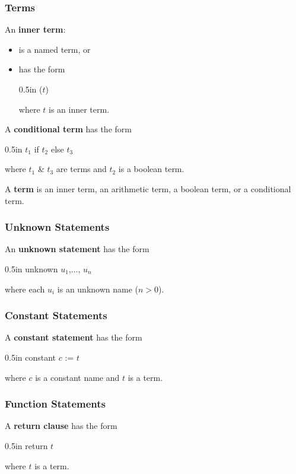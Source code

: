 \documentclass[letterpaper, 12pt]{extarticle}
\theoremstyle{definition} %
\newcommand{\textdef}[1]{\textbf{#1}}
\newenvironment{codeblock}
    {\begin{addmargin}{0.5in} \ttfamily}
    {\end{addmargin}}
\begin{document}
\newpage

\subsubsection{Terms}

An \textdef{inner term}:
\begin{itemize}
\item
is a named term, or
\item
has the form
\begin{codeblock}
($t$)
\end{codeblock}
where $t$ is an inner term.
\end{itemize}

A \textdef{conditional term} has the form
\begin{codeblock}
$t_1$ if $t_2$ else $t_3$
\end{codeblock}
where $t_1$ \& $t_3$ are terms and $t_2$ is a boolean term.

A \textdef{term} is an inner term, an arithmetic term,
a boolean term, or a conditional term.

\subsubsection{Unknown Statements}

An \textdef{unknown statement} has the form
\begin{codeblock}
unknown $u_1$,$\ldots$, $u_n$
\end{codeblock}
where each $u_i$ is an unknown name ($n > 0$).

\subsubsection{Constant Statements}

A \textdef{constant statement} has the form
\begin{codeblock}
constant $c$ := $t$
\end{codeblock}
where $c$ is a constant name and $t$ is a term.

\subsubsection{Function Statements}

A \textdef{return clause} has the form
\begin{codeblock}
return $t$
\end{codeblock}
where $t$ is a term.
\end{document}
